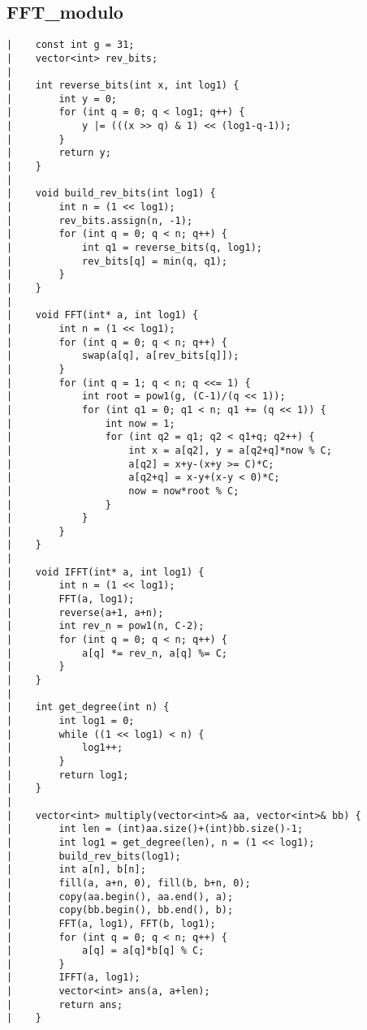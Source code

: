 \documentclass[a4paper, 10pt]{article}
\begin{document}
\begin{center}
\section*{FFT\_modulo}
\begin{verbatim}
|    const int g = 31;
|    vector<int> rev_bits;
|    
|    int reverse_bits(int x, int log1) {
|        int y = 0;
|        for (int q = 0; q < log1; q++) {
|            y |= (((x >> q) & 1) << (log1-q-1));
|        }
|        return y;
|    }
|    
|    void build_rev_bits(int log1) {
|        int n = (1 << log1);
|        rev_bits.assign(n, -1);
|        for (int q = 0; q < n; q++) {
|            int q1 = reverse_bits(q, log1);
|            rev_bits[q] = min(q, q1);
|        }
|    }
|    
|    void FFT(int* a, int log1) {
|        int n = (1 << log1);
|        for (int q = 0; q < n; q++) {
|            swap(a[q], a[rev_bits[q]]);
|        }
|        for (int q = 1; q < n; q <<= 1) {
|            int root = pow1(g, (C-1)/(q << 1));
|            for (int q1 = 0; q1 < n; q1 += (q << 1)) {
|                int now = 1;
|                for (int q2 = q1; q2 < q1+q; q2++) {
|                    int x = a[q2], y = a[q2+q]*now % C;
|                    a[q2] = x+y-(x+y >= C)*C;
|                    a[q2+q] = x-y+(x-y < 0)*C;
|                    now = now*root % C;
|                }
|            }
|        }
|    }
|    
|    void IFFT(int* a, int log1) {
|        int n = (1 << log1);
|        FFT(a, log1);
|        reverse(a+1, a+n);
|        int rev_n = pow1(n, C-2);
|        for (int q = 0; q < n; q++) {
|            a[q] *= rev_n, a[q] %= C;
|        }
|    }
|    
|    int get_degree(int n) {
|        int log1 = 0;
|        while ((1 << log1) < n) {
|            log1++;
|        }
|        return log1;
|    }
|    
|    vector<int> multiply(vector<int>& aa, vector<int>& bb) {
|        int len = (int)aa.size()+(int)bb.size()-1;
|        int log1 = get_degree(len), n = (1 << log1);
|        build_rev_bits(log1);
|        int a[n], b[n];
|        fill(a, a+n, 0), fill(b, b+n, 0);
|        copy(aa.begin(), aa.end(), a);
|        copy(bb.begin(), bb.end(), b);
|        FFT(a, log1), FFT(b, log1);
|        for (int q = 0; q < n; q++) {
|            a[q] = a[q]*b[q] % C;
|        }
|        IFFT(a, log1);
|        vector<int> ans(a, a+len);
|        return ans;
|    }
\end{verbatim}


\end{center}
\end{document}
